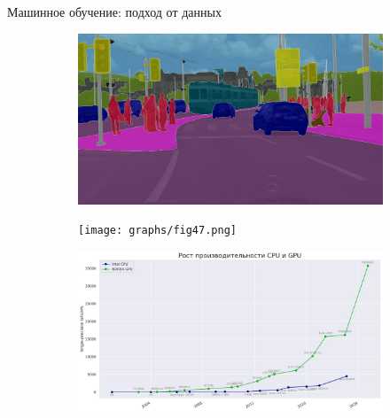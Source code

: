 \documentclass[aspectratio=169]{beamer}
\begin{document}
\begin{frame}{Машинное обучение: подход от данных}
\begin{figure}
\begin{subfigure}[b]{0.1\linewidth}
        \end{subfigure}
        \begin{subfigure}[b]{0.1\linewidth}
            \includegraphics[width=\linewidth]{graphs/fig33.jpg}
        \end{subfigure}
        \begin{subfigure}[b]{0.1\linewidth}
            \texttt{[image: graphs/fig47.png]}
        \end{subfigure}
        \begin{subfigure}[b]{0.1\linewidth}
            \includegraphics[width=\linewidth]{graphs/fig25.jpg}
        \end{subfigure}
        \begin{subfigure}[b]{0.1\linewidth}

\end{subfigure}
\end{figure}
\end{frame}
\end{document}
